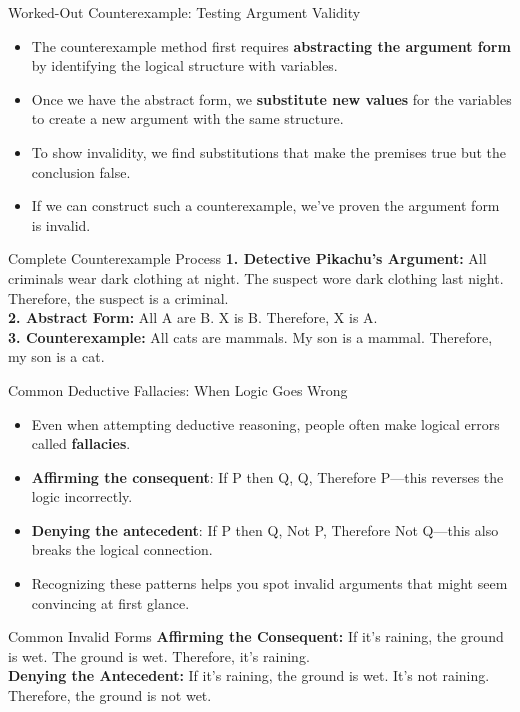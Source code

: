 \documentclass{beamer}
\begin{document}
\begin{frame}{Worked-Out Counterexample: Testing Argument Validity}
	\begin{itemize}
		\item The counterexample method first requires \textbf{abstracting the argument form} by identifying the logical structure with variables.
		\item Once we have the abstract form, we \textbf{substitute new values} for the variables to create a new argument with the same structure.
		\item To show invalidity, we find substitutions that make the premises true but the conclusion false.
		\item If we can construct such a counterexample, we've proven the argument form is invalid.
	\end{itemize}
	
	\begin{block}{Complete Counterexample Process}
		\scriptsize
		\textbf{1. Detective Pikachu's Argument:} All criminals wear dark clothing at night. The suspect wore dark clothing last night. Therefore, the suspect is a criminal.
		\\[0.5em]
		\textbf{2. Abstract Form:} All A are B. X is B. Therefore, X is A.
		\\[0.5em]
		\textbf{3. Counterexample:} All cats are mammals. My son is a mammal. Therefore, my son is a cat.
	\end{block}
\end{frame}

	\begin{frame}{Common Deductive Fallacies: When Logic Goes Wrong}
		\begin{itemize}
			\item Even when attempting deductive reasoning, people often make logical errors called \textbf{fallacies}.
			\item \textbf{Affirming the consequent}: If P then Q, Q, Therefore P—this reverses the logic incorrectly.
			\item \textbf{Denying the antecedent}: If P then Q, Not P, Therefore Not Q—this also breaks the logical connection.
			\item Recognizing these patterns helps you spot invalid arguments that might seem convincing at first glance.
		\end{itemize}
		
		\begin{block}{Common Invalid Forms}
			\textbf{Affirming the Consequent:} If it's raining, the ground is wet. The ground is wet. Therefore, it's raining.
			\\[0.5em]
			\textbf{Denying the Antecedent:} If it's raining, the ground is wet. It's not raining. Therefore, the ground is not wet.
		\end{block}
	\end{frame}
\end{document}

